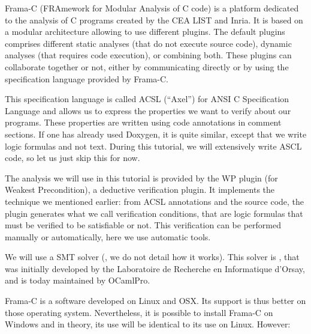 





Frama-C (FRAmework for Modular Analysis of C code) is a platform
dedicated to the analysis of C programs created by the CEA LIST and
Inria. It is based on a modular architecture allowing to use different
plugins. The default plugins comprises different static analyses (that
do not execute source code), dynamic analyses (that requires code
execution), or combining both. These plugins can collaborate together
or not, either by communicating directly or by using the specification
language provided by Frama-C.





This specification language is called ACSL (``Axel'') for
ANSI C Specification Language and allows us to express the
properties we want to verify about our programs. These properties are
written using code annotations in comment sections. If one has
already used Doxygen, it is quite similar, except that we write logic
formulas and not text. During this tutorial, we will extensively write
ASCL code, so let us just skip this for now.



The analysis we will use in this tutorial is provided by the WP plugin
(for Weakest Precondition), a deductive verification plugin. It implements
the technique we mentioned earlier: from
ACSL annotations and the source code, the plugin generates what we call
verification conditions, that are logic formulas that must be verified to be
satisfiable or not. This verification can be performed manually or
automatically, here we use automatic tools.



We will use a SMT solver
(, we do not detail how it works). This solver is
, that was initially developed
by the Laboratoire de Recherche en Informatique d'Orsay, and is today
maintained by OCamlPro.






Frama-C is a software developed on Linux and OSX. Its support is thus better
on those operating system. Nevertheless, it is possible to install Frama-C
on Windows and in theory, its use will be identical to its use on Linux.
However:



